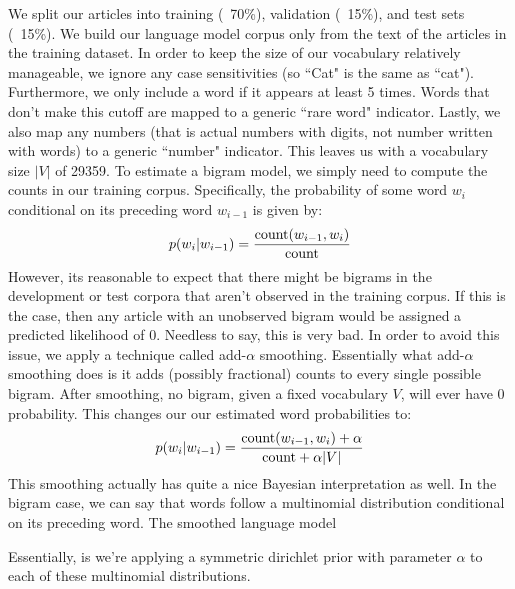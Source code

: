 \documentclass[fleqn,12pt]{SelfArx} %
\begin{document}
We split our articles into training (~70\%), validation (~15\%), and test sets (~15\%). We build our language model corpus only from the text of the articles in the training dataset. In order to keep the size of our vocabulary relatively manageable, we ignore any case sensitivities (so ``Cat" is the same as ``cat"). Furthermore, we only include a word if it appears at least 5 times. Words that don't make this cutoff are mapped to a generic ``rare word" indicator. Lastly, we also map any numbers (that is actual numbers with digits, not number written with words) to a generic ``number" indicator. This leaves us with a vocabulary size $|V|$ of 29359. To estimate a bigram model, we simply need to compute the counts in our training corpus. Specifically, the probability of some word $w_i$ conditional on its preceding word $w_{i-1}$ is given by:
\begin{equation}
p(w_i|w_{i-1}) = \frac{\textnormal{count}(w_{i-1},w_i)}{\textnormal{count}}
\end{equation}
However, its reasonable to expect that there might be bigrams in the development or test corpora that aren't observed in the training corpus. If this is the case, then any article with an unobserved bigram would be assigned a predicted likelihood of 0. Needless to say, this is very bad. In order to avoid this issue, we apply a technique called add-$\alpha$ smoothing. Essentially what add-$\alpha$ smoothing does is it adds (possibly fractional) counts to every single possible bigram. After smoothing, no bigram, given a fixed vocabulary $V$, will ever have 0 probability. This changes our our estimated word probabilities to:
\begin{equation}
p(w_i|w_{i-1}) = \frac{\textnormal{count}(w_{i-1},w_i) + \alpha}{\textnormal{count} + \alpha |V|}
\end{equation}
This smoothing actually has quite a nice Bayesian interpretation as well. In the bigram case, we can say that words follow a multinomial distribution conditional on its preceding word. The smoothed language model 

Essentially, is we're applying a symmetric dirichlet prior with parameter $\alpha$ to each of these multinomial distributions. 
\end{document}
